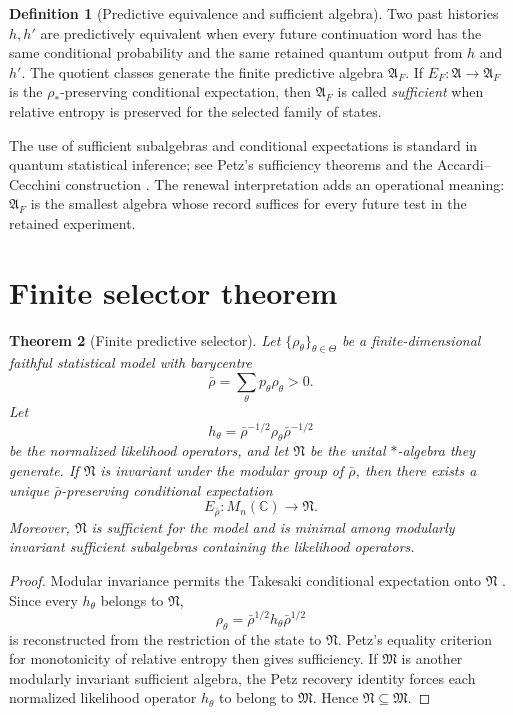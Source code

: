 \documentclass[11pt,oneside,openany]{book}
\numberwithin{equation}{chapter}
\newtheorem{theorem}{Theorem}[chapter]
\theoremstyle{definition}
\newtheorem{definition}[theorem]{Definition}
\theoremstyle{remark}
\newcommand{\C}{\mathbb C}
\begin{document}
\begin{definition}[Predictive equivalence and sufficient algebra]
Two past histories $h,h'$ are predictively equivalent when every future continuation word has the same conditional probability and the same retained quantum output from $h$ and $h'$.  The quotient classes generate the finite predictive algebra $\mathfrak A_F$.  If $E_F:\mathfrak A\to\mathfrak A_F$ is the $\rho_*$-preserving conditional expectation, then $\mathfrak A_F$ is called \emph{sufficient} when relative entropy is preserved for the selected family of states.
\end{definition}

The use of sufficient subalgebras and conditional expectations is standard in quantum statistical inference; see Petz's sufficiency theorems and the Accardi--Cecchini construction \cite{Petz1986,Petz1988,AccardiCecchini1982,Takesaki2003}.  The renewal interpretation adds an operational meaning: $\mathfrak A_F$ is the smallest algebra whose record suffices for every future test in the retained experiment.

\section{Finite selector theorem}

\begin{theorem}[Finite predictive selector]
\label{thm:finite-selector}
Let $\{\rho_\theta\}_{\theta\in\Theta}$ be a finite-dimensional faithful statistical model with barycentre
\[
 \bar\rho=\sum_{\theta}p_\theta\rho_\theta>0.
\]
Let
\[
 h_\theta=\bar\rho^{-1/2}\rho_\theta\bar\rho^{-1/2}
\]
be the normalized likelihood operators, and let $\mathfrak N$ be the unital $*$-algebra they generate.  If $\mathfrak N$ is invariant under the modular group of $\bar\rho$, then there exists a unique $\bar\rho$-preserving conditional expectation
\[
 E_{\bar\rho}:M_n(\C)\longrightarrow\mathfrak N.
\]
Moreover, $\mathfrak N$ is sufficient for the model and is minimal among modularly invariant sufficient subalgebras containing the likelihood operators.
\end{theorem}

\begin{proof}
Modular invariance permits the Takesaki conditional expectation onto $\mathfrak N$ \cite{Takesaki2003,AccardiCecchini1982}.  Since every $h_\theta$ belongs to $\mathfrak N$,
\[
 \rho_\theta=\bar\rho^{1/2}h_\theta\bar\rho^{1/2}
\]
is reconstructed from the restriction of the state to $\mathfrak N$.  Petz's equality criterion for monotonicity of relative entropy then gives sufficiency.  If $\mathfrak M$ is another modularly invariant sufficient algebra, the Petz recovery identity forces each normalized likelihood operator $h_\theta$ to belong to $\mathfrak M$.  Hence $\mathfrak N\subseteq\mathfrak M$.
\end{proof}
\end{document}
